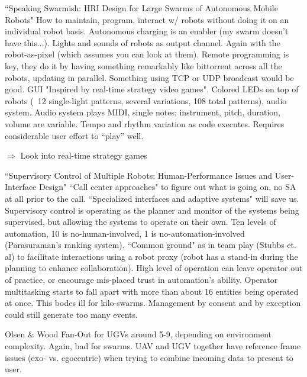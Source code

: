 \documentclass[]{article}
\begin{document}
``Speaking Swarmish: HRI Design for Large Swarms of Autonomous Mobile Robots" \cite{mclurkin2006speaking} How to maintain, program, interact w/ robots without doing it on an individual robot basis. Autonomous charging is an enabler (my swarm doesn't have this...). Lights and sounds of robots as output channel. Again with the robot-as-pixel (which assumes you can look at them). Remote programming is key, they do it by having something remarkably like bittorrent across all the robots, updating in parallel. Something using TCP or UDP broadcast would be good. GUI "Inspired by real-time strategy video games". Colored LEDs on top of robots (~12 single-light patterns, several variations, 108 total patterns), audio system. Audio system plays MIDI, single notes; instrument, pitch, duration, volume are variable. Tempo and rhythm variation as code executes. Requires considerable user effort to ``play'' well. 

$\Rightarrow$ Look into real-time strategy games 

``Supervisory Control of Multiple Robots: Human-Performance Issues and User-Interface Design" \cite{chen2011supervisory} ``Call center approaches" to figure out what is going on, no SA at all prior to the call. ``Specialized interfaces and adaptive systems" will save us. Supervisory control is operating as the planner and monitor of the systems being supervised, but allowing the systems to operate on their own. Ten levels of automation, 10 is no-human-involved, 1 is no-automation-involved (Parasuraman's ranking system). ``Common ground" as in team play (Stubbs et. al) to facilitate interactions using a robot proxy (robot has a stand-in during the planning to enhance collaboration). High level of operation can leave operator out of practice, or encourage mis-placed trust in automation's ability. Operator multitasking starts to fall apart with more than about 16 entities being operated at once. This bodes ill for kilo-swarms. Management by consent and by exception could still generate too many events. 

Olsen \& Wood Fan-Out for UGVs around 5-9, depending on environment complexity. Again, bad for swarms. UAV and UGV together have reference frame issues (exo- vs. egocentric) when trying to combine incoming data to present to user. 
\end{document}

